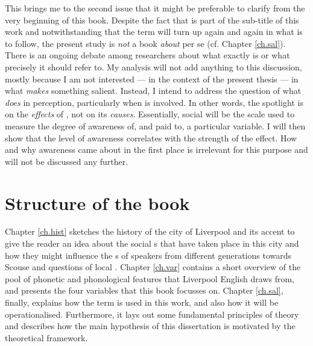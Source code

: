 This brings me to the second issue that it might be preferable to clarify from the very beginning of this book.
Despite the fact that \emph{} is part of the sub-title of this work and notwithstanding that the term will turn up again and again in what is to follow, the present study is \emph{not} a book \emph{about}  per se (cf. Chapter \ref{ch.sal}).
There is an ongoing debate among researchers about what exactly  is or what precisely it should refer to.
My analysis will not add anything to this discussion, mostly because I am not interested --- in the context of the present thesis --- in what \emph{makes} something salient.
Instead, I intend to address the question of what  \emph{does} in perception, particularly when  is involved.
In other words, the spotlight is on the \emph{effects} of , not on its \emph{causes}.
Essentially, social  will be the scale used to measure the degree of awareness of, and  paid to, a particular variable.
I will then show that the level of awareness correlates with the strength of the  effect.
How and why awareness came about in the first place is irrelevant for this purpose and will not be discussed any further.

\section{Structure of the book}
\label{sec.intro.structure}

Chapter \ref{ch.hist} sketches the history of the city of Liverpool and its accent to give the reader an idea about the social s that have taken place in this city and how they might influence the s of speakers from different generations towards Scouse and questions of local .
Chapter \ref{ch.var} contains a short overview of the pool of phonetic and phonological features that Liverpool English draws from, and presents the four variables that this book focusses on.
Chapter \ref{ch.sal}, finally, explains how the term \emph{} is used in this work, and also how it will be operationalised.
Furthermore, it lays out some fundamental principles of  theory and describes how the main hypothesis of this dissertation is motivated by the theoretical framework.

